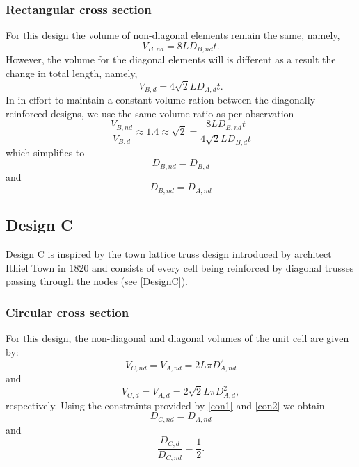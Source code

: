 \documentclass[10pt,twoside]{fernandes_supp}
\begin{document}
\subsubsection{Rectangular cross section}

For this design the volume of non-diagonal elements remain the same, namely,
\begin{equation}
		V_{B,nd}=8LD_{B,nd}t.
\end{equation}
However, the volume for the diagonal elements will is different as a result the change in total length, namely,
\begin{equation}
		V_{B,d}=4\sqrt{2}LD_{A,d}t.
\end{equation}
In in effort to maintain a constant volume ration between the diagonally reinforced designs, we use the same volume ratio as per observation
\begin{equation}
		\frac{V_{B,nd}}{V_{B,d}}\approx 1.4\approx\sqrt{2}=\frac{8LD_{B,nd}t}{4\sqrt{2}LD_{B,d}t}
\end{equation}
which simplifies to
\begin{equation}
	D_{B,nd}=D_{B,d}
\end{equation}
and
\begin{equation}
	D_{B,nd}=D_{A,nd}
\end{equation}

\subsection{Design C}
Design C is inspired by the town lattice truss design introduced by architect Ithiel Town in 1820 \citep{waddell1916} and consists of every cell being reinforced by diagonal trusses passing through the nodes (see \cref{DesignC}).

\subsubsection{Circular cross section}
For this design, the non-diagonal and diagonal volumes of the unit cell are given by:
\begin{equation}
V_{C,nd}=V_{A,nd}=2 L \pi D^2_{A,nd}
\end{equation}
and
\begin{equation}
V_{C,d}=V_{A,d}=2\sqrt{2}L \pi D^2_{A,d},
\end{equation}
respectively.
Using the constraints provided by \cref{con1} and \cref{con2} we  obtain 
\begin{equation}
{{D}_{C,nd}}={{D}_{A,nd}}
\end{equation}
and
\begin{equation}
\frac{{D}_{C,d}}{{D}_{C,nd}}=\frac{1}{2}.
\end{equation}
\end{document}
